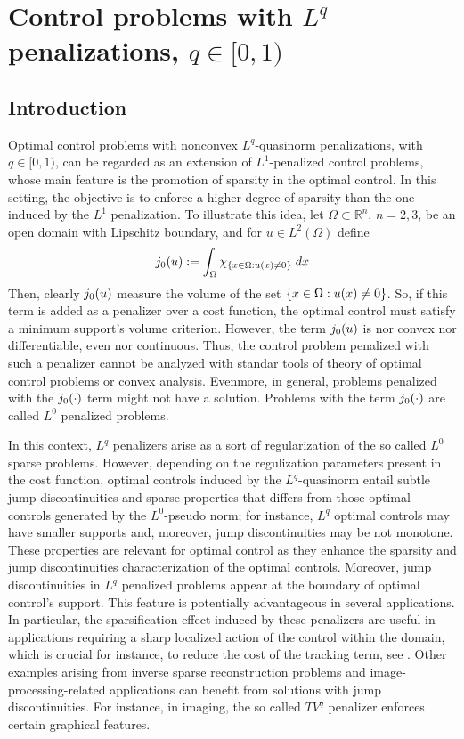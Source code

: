 \chapter{Control problems with $L^q$ penalizations, $q\in[0,1)$}\label{chap3}

	
		\section{Introduction}
		Optimal control problems with nonconvex $L^q$-quasinorm penalizations, with $q\in[0,1)$, can be regarded 
		as an extension of $L^1$-penalized control problems, whose main feature is the promotion of 
		sparsity in the optimal control. In this setting, the objective is to enforce a higher degree 
		of sparsity than the one induced by the $L^1$ penalization. To illustrate this idea, 
		let $\Omega\subset\mathbb{R}^n$, $n=2,3$, be an open domain with Lipschitz boundary, 
		and for $u\in L^2(\Omega)$ define
		\[
		j_0(u):=\int_{\Omega} \chi_{\{x\in\Omega: u(x)\ne 0\}}\; dx
		\]
		Then, clearly $j_0(u)$ measure the volume of the set $\{x\in\Omega: u(x)\ne 0\}$. So, if this term
		is added as a penalizer over a cost function, the optimal control must satisfy a minimum support's
		volume criterion. However, the term $j_0(u)$ is nor convex nor differentiable, even nor continuous. Thus, the control problem penalized with 
		such a penalizer cannot be analyzed with standar tools of theory of optimal control problems or
		convex analysis. Evenmore, in general, problems penalized with the $j_0(\cdot)$ term might not
		have a solution. Problems with the term $j_0(\cdot)$ are called $L^0$ penalized problems.
		
		In this context, $L^q$ penalizers arise as a sort of regularization of the so called $L^0$ sparse 
		problems.  However, depending on the regulization parameters present in the cost function, optimal controls
		induced by the  $L^q$-quasinorm entail subtle jump discontinuities and sparse properties that differs from 
		those optimal controls generated by the $L^0$-pseudo norm; for instance, $L^q$ optimal controls may have 
		smaller supports and, moreover, jump discontinuities may be not monotone. These properties 
		are relevant for optimal control as they enhance the sparsity and jump discontinuities 
		characterization of the optimal controls. Moreover, jump discontinuities in $L^q$ penalized problems appear at 
		the boundary of optimal control's support. This feature is potentially advantageous in several 
		applications. 	In particular, the sparsification effect induced by these penalizers are useful in
	 	applications requiring a sharp localized action of the control within the domain, which is crucial 
	 	for instance, to reduce the cost of the tracking term, see \cite{casas}.  Other examples arising 
	 	from inverse 	sparse reconstruction problems and image-processing-related applications can 
	 	benefit from solutions with jump discontinuities. For instance, in imaging, the so called 
	 	$TV^q$ penalizer enforces certain graphical features. 

